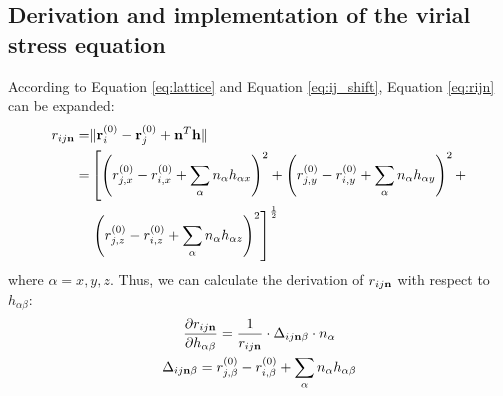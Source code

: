 \documentclass[preprint]{revtex4-2}
\begin{document}
{\subsection{Derivation and implementation of the virial stress equation}

According to Equation \ref{eq:lattice} and Equation \ref{eq:ij_shift}, Equation 
\ref{eq:rijn} can be expanded:
\begin{align}
r_{ij\mathbf{n}} = & \Vert \mathbf{r}_i^{(0)} - \mathbf{r}_j^{(0)} + 
           \mathbf{n}^T \mathbf{h} \Vert \nonumber \\
      = & \left[
                 \left(r_{j,x}^{(0)} - r_{i,x}^{(0)} + 
                       \sum_{\alpha}{n_{\alpha}h_{\alpha x}} \right)^2 +
                 \left(r_{j,y}^{(0)} - r_{i,y}^{(0)} + 
                       \sum_{\alpha}{n_{\alpha}h_{\alpha y}} \right)^2 + \right.
        \nonumber \\
        & \left. \left(r_{j,z}^{(0)} - r_{i,z}^{(0)} + 
                       \sum_{\alpha}{n_{\alpha}h_{\alpha z}} \right)^2 
          \right]^{\frac{1}{2}}
\end{align}
where $\alpha=x,y,z$. Thus, we can calculate the derivation of $r_{ij\mathbf{n}}$ with 
respect to $h_{\alpha\beta}$:
\begin{gather}
\frac{\partial r_{ij\mathbf{n}}}{\partial h_{\alpha\beta}} = 
    \frac{1}{r_{ij\mathbf{n}}} \cdot \Delta_{ij\mathbf{n}\beta} \cdot n_{\alpha} \\
\Delta_{ij\mathbf{n}\beta} = r_{j,\beta}^{(0)} - r_{i,\beta}^{(0)} + 
    \sum_{\alpha}{n_{\alpha}h_{\alpha \beta}}
\end{gather}

\newcommand{\hab}{h_{\alpha\beta}}
\newcommand{\hga}{h_{\gamma\alpha}}
\newcommand{\hgb}{h_{\gamma\beta}}

}
\end{document}
